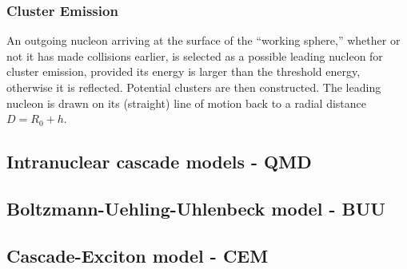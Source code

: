 \subsubsection{Cluster Emission}
An outgoing nucleon arriving at the surface of the “working sphere,” whether or not it has made collisions earlier, is selected as a possible leading nucleon for cluster emission, provided its energy is larger than the threshold energy, otherwise it is reflected.
Potential clusters are then constructed. The leading nucleon is drawn on its (straight) line of motion back to a radial distance
$D=R_{0}+h$.
\subsection{Intranuclear cascade models - QMD}
\subsection{Boltzmann-Uehling-Uhlenbeck model - BUU}
\subsection{Cascade-Exciton model - CEM}